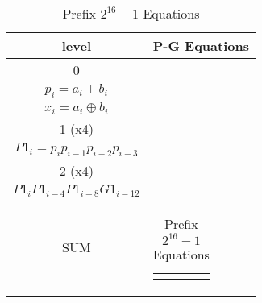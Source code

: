 \begin{table}[H]
\centering
     \begin{tabularx}{\textwidth}{ || c | X || } 

        \hline
        level & P-G Equations\\
        \hline
        \hline
 
        0   & 
        \begin{tabular}{@{}c@{}}
        $g_i = a_i * b_i$\\
        $p_i = a_i + b_i$\\
        $x_i = a_i \oplus b_i $
        \end{tabular}\\\hline

        1 (x4)  & 
        \begin{tabular}{@{}c@{}}
        $G1_i = g_i + p_ig_{i-1} + p_ip_{i-1}g_{i-1} + p_ip_{i-1}p_{i-2}g_{i-1}$\\
        $P1_i = p_i p_{i-1} p_{i-2} p_{i-3}$
        \end{tabular}\\\hline

        2 (x4)  & 
        \begin{tabular}{@{}c@{}}
        $G2_i = G1_i + P1_{i}G1_{i-4} + P1_{i}P1_{i-4}G1_{i-8} +$ \\ $P1_{i}P1_{i-4}P1_{i-8}G1_{i-12}$
        \end{tabular}\\\hline

        SUM   & 
        \begin{tabular}{@{}c@{}}
        $ sum_i = G_{i-1} \oplus x_i$
        \end{tabular}\\\hline

    \end{tabularx}
\caption{Prefix $2^{16}-1$ Equations}
\end{table}


